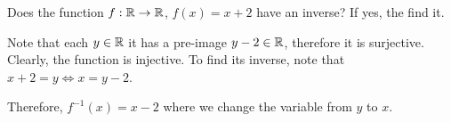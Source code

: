 \begin{example}
    Does the function \(f : \mathbb R \to \mathbb R\), \(f(x) = x + 2\) have an inverse?
    If yes, the find it.

    \begin{soln}
        Note that each \(y \in \mathbb R\) it has a pre-image \(y - 2 \in \mathbb R\), therefore
        it is surjective. Clearly, the function is injective.
        To find its inverse, note that \(x + 2 = y \iff x = y - 2\).

        Therefore, \(f^{-1}(x) = x-2\) where we change the variable from 
        \(y\) to \(x\). 
    \end{soln}
\end{example}